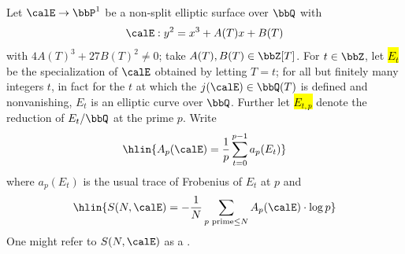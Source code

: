 \begin{definition} \label{definition:average_trace_of_frobenius_of_specialization_of_rational_elliptic_curves_in_a_family}
    Let $\calE \to \bbP^1$ be a non-split elliptic surface over $\bbQ$ with 
    $$\calE: y^2 = x^3 + A(T) x + B(T)$$
    with $4A(T)^3 + 27B(T)^2 \neq 0$; take $A(T), B(T) \in \bbZ[T]$. For $t \in \bbZ$, let \hl{$E_t$} be the specialization of $\calE$ obtained by letting $T = t$; for all but finitely many integers $t$, in fact for the $t$ at which the  $j(\calE) \in \bbQ(T)$ is defined and nonvanishing, $E_t$ is an elliptic curve over $\bbQ$. Further let \hl{$E_{t,p}$} denote the reduction of $E_t/\bbQ$ at the prime $p$. 
    Write 
    $$\hlin{A_p(\calE) = \frac{1}{p} \sum_{t=0}^{p-1} a_p(E_t)}$$
    where $a_p(E_t)$ is the usual trace of Frobenius of $E_t$ at $p$ 
    and 
    $$\hlin{S(N, \calE) = - \frac{1}{N} \sum_{p \text{ prime} \leq N} A_p(\calE) \cdot \log p}$$
    One might refer to $S(N,\calE)$ as a .
\end{definition}